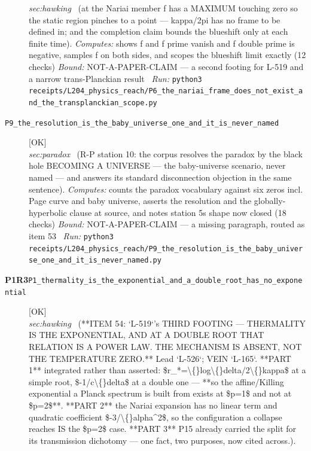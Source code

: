 \begin{description}
\textit{sec:hawking} \ (at the Nariai member f has a MAXIMUM touching zero so the static region pinches to a point --- kappa/2pi has no frame to be defined in; and the completion claim bounds the blueshift only at each finite time). 
\emph{Computes:} shows f and f prime vanish and f double prime is negative, samples f on both sides, and scopes the blueshift limit exactly (12 checks)
 \emph{Bound:} NOT-A-PAPER-CLAIM --- a second footing for L-519 and a narrow trans-Planckian result
\ \emph{Run:} \texttt{python3 receipts/L204\_physics\_reach/P6\_the\_nariai\_frame\_does\_not\_exist\_and\_the\_transplanckian\_scope.py}
\item[\label{rcpt:P9_the_resolution_is_the_baby_universe_one_and_it_is_never_named}\textbf{}\quad\texttt{P9\_the\_resolution\_is\_the\_baby\_universe\_one\_and\_it\_is\_never\_named}]\hfill\textsf{[OK]}\\
\textit{sec:paradox} \ (R-P station 10: the corpus resolves the paradox by the black hole BECOMING A UNIVERSE --- the baby-universe scenario, never named --- and answers its standard disconnection objection in the same sentence). 
\emph{Computes:} counts the paradox vocabulary against six zeros incl. Page curve and baby universe, asserts the resolution and the globally-hyperbolic clause at source, and notes station 5s shape now closed (18 checks)
 \emph{Bound:} NOT-A-PAPER-CLAIM --- a missing paragraph, routed as item 53
\ \emph{Run:} \texttt{python3 receipts/L204\_physics\_reach/P9\_the\_resolution\_is\_the\_baby\_universe\_one\_and\_it\_is\_never\_named.py}
\item[\rcptlabel{P1_thermality_is_the_exponential_and_a_double_root_has_no_exponential}{P1R3}\textbf{P1R3}\quad\texttt{P1\_thermality\_is\_the\_exponential\_and\_a\_double\_root\_has\_no\_exponential}]\hfill\textsf{[OK]}\\
\textit{sec:hawking} \ (**ITEM 54: `L-519`'s THIRD FOOTING --- THERMALITY IS THE EXPONENTIAL, AND AT A DOUBLE ROOT THAT RELATION IS A POWER LAW. THE MECHANISM IS ABSENT, NOT THE TEMPERATURE ZERO.** Lead `L-526`; VEIN `L-165`. **PART 1** integrated rather than asserted: \$r\_*=\textbackslash\{\}log\textbackslash\{\}delta/2\textbackslash\{\}kappa\$ at a simple root, \$-1/c\textbackslash\{\}delta\$ at a double one --- **so the affine/Killing exponential a Planck spectrum is built from exists at \$p=1\$ and not at \$p=2\$**. **PART 2** the Nariai expansion has no linear term and quadratic coefficient \$-3/\textbackslash\{\}alpha\textasciicircum{}2\$, so the configuration a collapse reaches IS the \$p=2\$ case. **PART 3** P15 already carried the split for its transmission dichotomy --- one fact, two purposes, now cited across.). 

\end{description}
